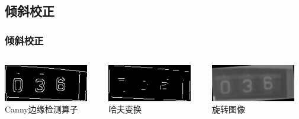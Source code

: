 \documentclass[12pt,hyperref={CJKbookmarks=true}]{beamer}
\begin{document}
\subsection{倾斜校正}

\begin{frame}
  \frametitle{倾斜校正}
  \begin{columns}
    \begin{column}{0.3\textwidth}
      \centering
      \includegraphics[width=0.9\textwidth]{canny.png}\\
      \footnotesize Canny边缘检测算子
    \end{column}
    \begin{column}{0.3\textwidth}
      \centering
      \includegraphics[width=0.9\textwidth]{hough.png}\\
      \footnotesize 哈夫变换
    \end{column}
    \begin{column}{0.3\textwidth}
      \centering
      \includegraphics[width=0.9\textwidth]{rotate.png}\\
      \footnotesize 旋转图像
    \end{column}
  \end{columns}
\end{frame}
\end{document}
